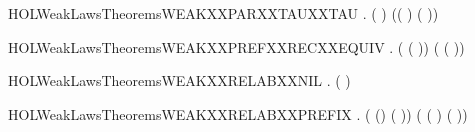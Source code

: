 \newcommand{\HOLWeakLawsTheoremsWEAKXXPARXXTAUXXPREF}{\UseVerbatim{HOLWeakLawsTheoremsWEAKXXPARXXTAUXXPREF}}
\begin{SaveVerbatim}{HOLWeakLawsTheoremsWEAKXXPARXXTAUXXTAU}
\HOLTokenTurnstile{} \HOLSymConst{\HOLTokenForall{}} .
        (\HOLConst{\ensuremath{\tau}} \HOLSymConst{\ensuremath{\parallel}} \HOLConst{\ensuremath{\tau}})
         (\HOLConst{\ensuremath{\tau}}( \HOLSymConst{\ensuremath{\parallel}} \HOLConst{\ensuremath{\tau}}) \HOLSymConst{+} \HOLConst{\ensuremath{\tau}}(\HOLConst{\ensuremath{\tau}} \HOLSymConst{\ensuremath{\parallel}} ))
\end{SaveVerbatim}
\newcommand{\HOLWeakLawsTheoremsWEAKXXPARXXTAUXXTAU}{\UseVerbatim{HOLWeakLawsTheoremsWEAKXXPARXXTAUXXTAU}}
\begin{SaveVerbatim}{HOLWeakLawsTheoremsWEAKXXPREFXXRECXXEQUIV}
\HOLTokenTurnstile{} \HOLSymConst{\HOLTokenForall{}}  .
        (  ( )) (  ( ))
\end{SaveVerbatim}
\newcommand{\HOLWeakLawsTheoremsWEAKXXPREFXXRECXXEQUIV}{\UseVerbatim{HOLWeakLawsTheoremsWEAKXXPREFXXRECXXEQUIV}}
\begin{SaveVerbatim}{HOLWeakLawsTheoremsWEAKXXRELABXXNIL}
\HOLTokenTurnstile{} \HOLSymConst{\HOLTokenForall{}}.  (  ) 
\end{SaveVerbatim}
\newcommand{\HOLWeakLawsTheoremsWEAKXXRELABXXNIL}{\UseVerbatim{HOLWeakLawsTheoremsWEAKXXRELABXXNIL}}
\begin{SaveVerbatim}{HOLWeakLawsTheoremsWEAKXXRELABXXPREFIX}
\HOLTokenTurnstile{} \HOLSymConst{\HOLTokenForall{}}  .
        ( () ( ))
         ( ( )   ( ))
\end{SaveVerbatim}
